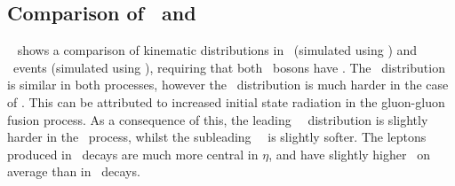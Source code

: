 \subsection{Comparison of \ggZZ\ and \qqZZ}

~ shows a comparison of kinematic distributions in \ggZZ\ 
(simulated using \ggtwoZZ) and \qqZZ\ events (simulated using \powhegbox), 
requiring that both \Z\ bosons have \sstooos. 
The \mZZ\ distribution is similar in both 
processes, however the \ptZZ\ distribution is much harder in the case of \ggZZ.  
This can be attributed to increased initial state radiation in the gluon-gluon 
fusion process. As a consequence of this, the leading \Z\ \pt\ distribution is 
slightly harder in the \ggZZ\ process, whilst the subleading \Z\ \pt\ is 
slightly softer. The leptons produced in \ggZZ\ decays are much more central in
$\eta$, 
and have slightly higher \pt\ on average than in \qqZZ\ decays.

